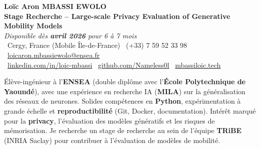 \documentclass[a4paper,11pt]{article}
\begin{document}
\begin{center}
    {\Large \textbf{Loïc Aron MBASSI EWOLO}} \\ \vspace{4pt}
    \textbf{\large Stage Recherche -- Large-scale Privacy Evaluation of Generative Mobility Models} \\
    \textit{\small Disponible dès \textbf{avril 2026} pour 6 à 7 mois} \\ \vspace{4pt}
    \small
    \faMapMarker\ Cergy, France (Mobile Île-de-France) \quad
    \faPhone\ (+33) 7 59 52 33 98 \quad
    \faEnvelope\ \href{mailto:loicaron.mbassiewolo@ensea.fr}{loicaron.mbassiewolo@ensea.fr} \\ \vspace{2pt}
    \faLinkedin\ \href{https://www.linkedin.com/in/loic-aron-mbassi-ewolo-3942a9246/}{linkedin.com/in/loic-mbassi} \quad
    \faGithub\ \href{https://github.com/Nameless0l}{github.com/Nameless0l} \quad
    \faGlobe\ \href{https://mbassiloic.tech}{mbassiloic.tech}
\end{center}

\vspace{-6pt}

\noindent\small{Élève-ingénieur à l'\textbf{ENSEA} (double diplôme avec l'\textbf{École Polytechnique de Yaoundé}), avec une expérience en recherche IA (\textbf{MILA}) sur la généralisation des réseaux de neurones. Solides compétences en \textbf{Python}, expérimentation à grande échelle et \textbf{reproductibilité} (Git, Docker, documentation). Intérêt marqué pour la \textbf{privacy}, l'évaluation des modèles génératifs et les risques de mémorisation. Je recherche un stage de recherche au sein de l'équipe \textbf{TRiBE} (INRIA Saclay) pour contribuer à l'évaluation de modèles de mobilité.}

\end{document}
